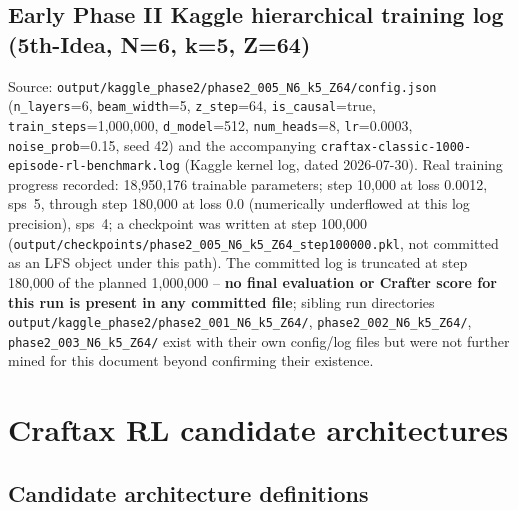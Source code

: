 \documentclass[11pt]{article}
\newcommand{\srcpath}[1]{\texttt{\small #1}}
\begin{document}
\subsection{Early Phase II Kaggle hierarchical training log (5th-Idea, N=6, k=5, Z=64)}

Source: \srcpath{output/kaggle\_phase2/phase2\_005\_N6\_k5\_Z64/config.json} (\texttt{n\_layers}=6,
\texttt{beam\_width}=5, \texttt{z\_step}=64, \texttt{is\_causal}=true, \texttt{train\_steps}=1{,}000{,}000,
\texttt{d\_model}=512, \texttt{num\_heads}=8, \texttt{lr}=0.0003, \texttt{noise\_prob}=0.15, seed 42)
and the accompanying \texttt{craftax-classic-1000-episode-rl-benchmark.log} (Kaggle kernel log,
dated 2026-07-30). Real training progress recorded: 18,950,176 trainable parameters; step 10,000 at
loss 0.0012, sps~5, through step 180,000 at loss 0.0 (numerically underflowed at this log
precision), sps~4; a checkpoint was written at step 100,000
(\texttt{output/checkpoints/phase2\_005\_N6\_k5\_Z64\_step100000.pkl}, not committed as an LFS
object under this path). The committed log is truncated at step 180,000 of the planned 1,000,000 --
\textbf{no final evaluation or Crafter score for this run is present in any committed file}; sibling
run directories \srcpath{output/kaggle\_phase2/phase2\_001\_N6\_k5\_Z64/},
\srcpath{phase2\_002\_N6\_k5\_Z64/}, \srcpath{phase2\_003\_N6\_k5\_Z64/} exist with their own
config/log files but were not further mined for this document beyond confirming their existence.

\clearpage
\section{Craftax RL candidate architectures}
\label{sec:craftax}

\subsection{Candidate architecture definitions}
\end{document}
